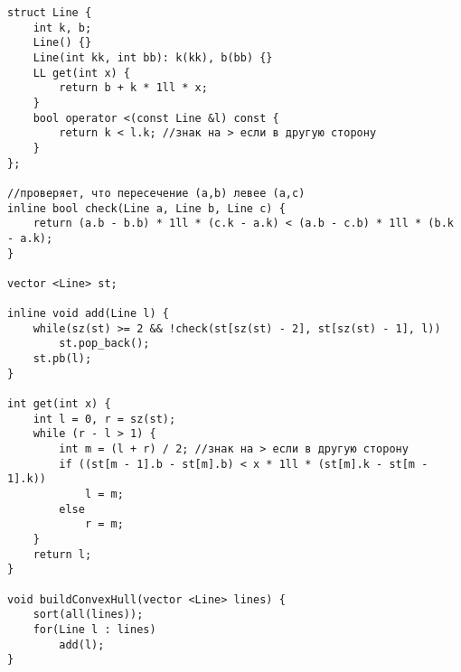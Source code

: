 \begin{verbatim}
struct Line {
	int k, b;
	Line() {}
	Line(int kk, int bb): k(kk), b(bb) {}
	LL get(int x) {
		return b + k * 1ll * x;
	}
	bool operator <(const Line &l) const {
		return k < l.k; //знак на > если в другую сторону
	}
};

//проверяет, что пересечение (a,b) левее (a,c)
inline bool check(Line a, Line b, Line c) { 
	return (a.b - b.b) * 1ll * (c.k - a.k) < (a.b - c.b) * 1ll * (b.k - a.k);
}

vector <Line> st;

inline void add(Line l) {
	while(sz(st) >= 2 && !check(st[sz(st) - 2], st[sz(st) - 1], l))
		st.pop_back();
	st.pb(l);
}

int get(int x) {
	int l = 0, r = sz(st);
	while (r - l > 1) {
		int m = (l + r) / 2; //знак на > если в другую сторону
		if ((st[m - 1].b - st[m].b) < x * 1ll * (st[m].k - st[m - 1].k))
			l = m;
		else
			r = m;
	}
	return l;
}

void buildConvexHull(vector <Line> lines) {
	sort(all(lines));
	for(Line l : lines)
		add(l);
}
\end{verbatim}
